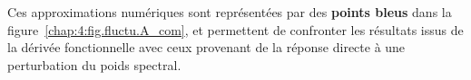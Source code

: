\medskip

Ces approximations numériques sont représentées par des {\bf points bleus} dans la figure~\ref{chap:4:fig.fluctu.A_com}, et permettent de confronter les résultats issus de la dérivée fonctionnelle avec ceux provenant de la réponse directe à une perturbation du poids spectral.





 

%


